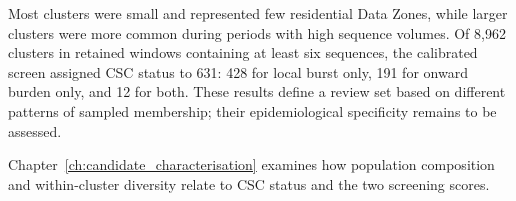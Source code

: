 Most clusters were small and represented few residential Data Zones, while larger clusters were more common during periods with high sequence volumes. Of 8,962 clusters in retained windows containing at least six sequences, the calibrated screen assigned CSC status to 631: 428 for local burst only, 191 for onward burden only, and 12 for both. These results define a review set based on different patterns of sampled membership; their epidemiological specificity remains to be assessed.

Chapter~\ref{ch:candidate_characterisation} examines how population composition and within-cluster diversity relate to CSC status and the two screening scores.
